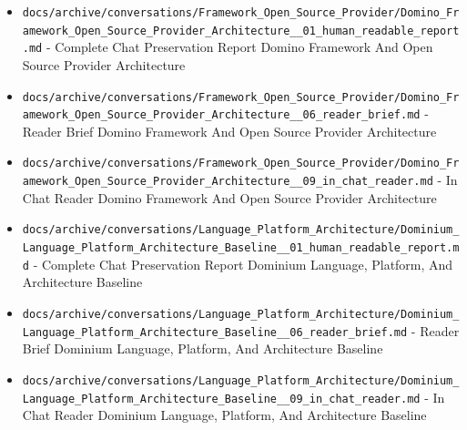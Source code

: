 \documentclass[10.5pt,a4paper,openany]{book}
\begin{document}
\begin{itemize}
\item \texttt{docs/\allowbreak{}archive/\allowbreak{}conversations/\allowbreak{}Framework\_\allowbreak{}Open\_\allowbreak{}Source\_\allowbreak{}Provider/\allowbreak{}Domino\_\allowbreak{}Framework\_\allowbreak{}Open\_\allowbreak{}Source\_\allowbreak{}Provider\_\allowbreak{}Architecture\_\allowbreak{}\_\allowbreak{}01\_\allowbreak{}human\_\allowbreak{}readable\_\allowbreak{}report.\allowbreak{}md} -\allowbreak{} Complete Chat Preservation Report Domino Framework And Open Source Provider Architecture
\item \texttt{docs/\allowbreak{}archive/\allowbreak{}conversations/\allowbreak{}Framework\_\allowbreak{}Open\_\allowbreak{}Source\_\allowbreak{}Provider/\allowbreak{}Domino\_\allowbreak{}Framework\_\allowbreak{}Open\_\allowbreak{}Source\_\allowbreak{}Provider\_\allowbreak{}Architecture\_\allowbreak{}\_\allowbreak{}06\_\allowbreak{}reader\_\allowbreak{}brief.\allowbreak{}md} -\allowbreak{} Reader Brief Domino Framework And Open Source Provider Architecture
\item \texttt{docs/\allowbreak{}archive/\allowbreak{}conversations/\allowbreak{}Framework\_\allowbreak{}Open\_\allowbreak{}Source\_\allowbreak{}Provider/\allowbreak{}Domino\_\allowbreak{}Framework\_\allowbreak{}Open\_\allowbreak{}Source\_\allowbreak{}Provider\_\allowbreak{}Architecture\_\allowbreak{}\_\allowbreak{}09\_\allowbreak{}in\_\allowbreak{}chat\_\allowbreak{}reader.\allowbreak{}md} -\allowbreak{} In Chat Reader Domino Framework And Open Source Provider Architecture
\item \texttt{docs/\allowbreak{}archive/\allowbreak{}conversations/\allowbreak{}Language\_\allowbreak{}Platform\_\allowbreak{}Architecture/\allowbreak{}Dominium\_\allowbreak{}Language\_\allowbreak{}Platform\_\allowbreak{}Architecture\_\allowbreak{}Baseline\_\allowbreak{}\_\allowbreak{}01\_\allowbreak{}human\_\allowbreak{}readable\_\allowbreak{}report.\allowbreak{}md} -\allowbreak{} Complete Chat Preservation Report Dominium Language, Platform, And Architecture Baseline
\item \texttt{docs/\allowbreak{}archive/\allowbreak{}conversations/\allowbreak{}Language\_\allowbreak{}Platform\_\allowbreak{}Architecture/\allowbreak{}Dominium\_\allowbreak{}Language\_\allowbreak{}Platform\_\allowbreak{}Architecture\_\allowbreak{}Baseline\_\allowbreak{}\_\allowbreak{}06\_\allowbreak{}reader\_\allowbreak{}brief.\allowbreak{}md} -\allowbreak{} Reader Brief Dominium Language, Platform, And Architecture Baseline
\item \texttt{docs/\allowbreak{}archive/\allowbreak{}conversations/\allowbreak{}Language\_\allowbreak{}Platform\_\allowbreak{}Architecture/\allowbreak{}Dominium\_\allowbreak{}Language\_\allowbreak{}Platform\_\allowbreak{}Architecture\_\allowbreak{}Baseline\_\allowbreak{}\_\allowbreak{}09\_\allowbreak{}in\_\allowbreak{}chat\_\allowbreak{}reader.\allowbreak{}md} -\allowbreak{} In Chat Reader Dominium Language, Platform, And Architecture Baseline

\end{itemize}
\end{document}
